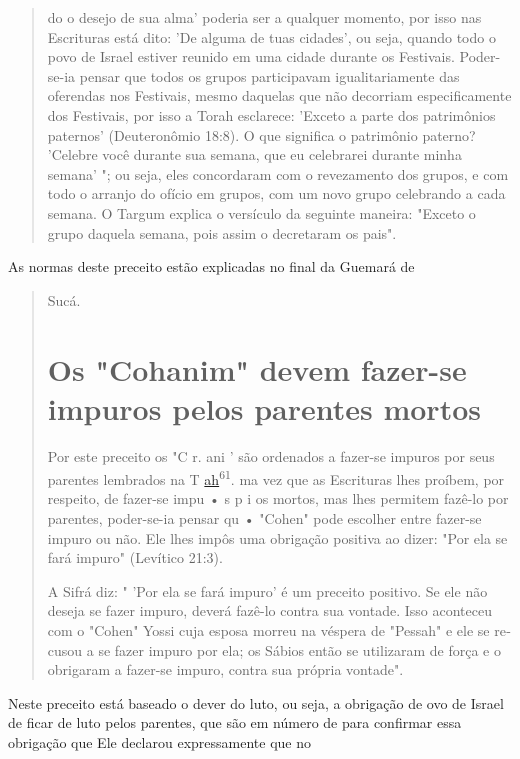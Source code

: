 \begin{quote}


do o desejo de sua alma' poderia ser a qualquer momento, por isso nas
Escritu­ras está dito: 'De alguma de tuas cidades', ou seja, quando todo
o povo de Is­rael estiver reunido em uma cidade durante os Festivais.
Poder-se-ia pensar que todos os grupos participavam igualitariamente das
oferendas nos Festivais, mes­mo daquelas que não decorriam
especificamente dos Festivais, por isso a To­rah esclarece: 'Exceto a
parte dos patrimônios paternos' (Deuteronômio 18:8). O que significa o
patrimônio paterno? 'Celebre você durante sua semana, que eu celebrarei
durante minha semana' "; ou seja, eles concordaram com o reve­zamento
dos grupos, e com todo o arranjo do ofício em grupos, com um novo grupo
celebrando a cada semana. O Targum explica o versículo da seguinte
ma­neira: "Exceto o grupo daquela semana, pois assim o decretaram os
pais".
\end{quote}

As normas deste preceito estão explicadas no final da Guemará de

\begin{quote}
Sucá.

\section{Os "Cohanim" devem fazer-se impuros pelos parentes mortos}

Por este preceito os "C r. ani ' são ordenados a fazer-se impuros por
seus parentes lembrados na T
{\href{http://ah61.ma}{ah}\textsuperscript{61}. ma} vez que as
Escrituras lhes proí­bem, por respeito, de fazer-se impu • s p i os
mortos, mas lhes permitem fazê-lo por parentes, poder-se-ia pensar qu •
"Cohen" pode escolher entre fazer-se impuro ou não. Ele lhes impôs uma
obrigação positiva ao dizer: "Por ela se fará impuro" (Levítico 21:3).

A Sifrá diz: " 'Por ela se fará impuro' é um preceito positivo. Se ele
não deseja se fazer impuro, deverá fazê-lo contra sua vontade. Isso
aconteceu com o "Cohen" Yossi cuja esposa morreu na véspera de "Pessah"
e ele se re­cusou a se fazer impuro por ela; os Sábios então se
utilizaram de força e o obri­garam a fazer-se impuro, contra sua própria
vontade".
\end{quote}

Neste preceito está baseado o dever do luto, ou seja, a obrigação de ovo
de Israel de ficar de luto pelos parentes, que são em número de para
confirmar essa obrigação que Ele declarou expressamente que no

